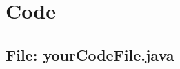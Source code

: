 \documentclass[12pt,a4paper]{report}
\theoremstyle{definition}
\begin{document}
\chapter{Code}


\begin{landscape}
\begin{multicols}{2}
\section{File: yourCodeFile.java}

\end{multicols}
\end{landscape}

\end{document}
